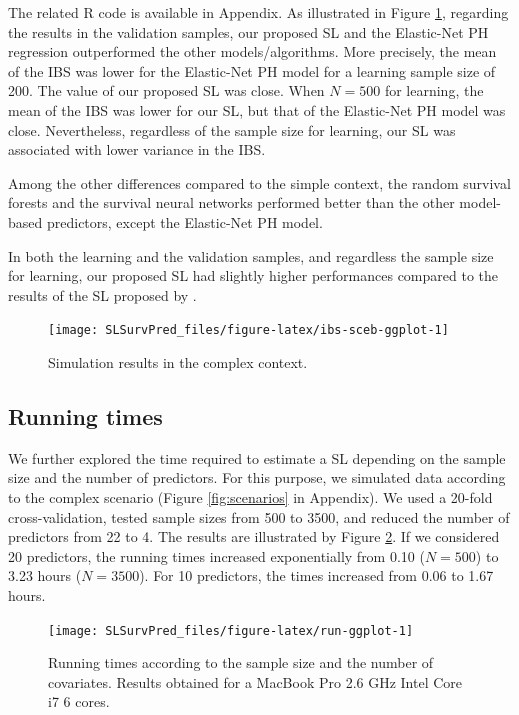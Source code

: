 The related \textsf{R} code is available in Appendix. As illustrated in Figure \ref{fig:ibs-sceb-ggplot}, regarding the results in the validation samples, our proposed SL and the Elastic-Net PH regression outperformed the other models/algorithms. More precisely, the mean of the IBS was lower for the Elastic-Net PH model for a learning sample size of 200. The value of our proposed SL was close. When \(N=500\) for learning, the mean of the IBS was lower for our SL, but that of the Elastic-Net PH model was close. Nevertheless, regardless of the sample size for learning, our SL was associated with lower variance in the IBS.

Among the other differences compared to the simple context, the random survival forests and the survival neural networks performed better than the other model-based predictors, except the Elastic-Net PH model.

In both the learning and the validation samples, and regardless the sample size for learning, our proposed SL had slightly higher performances compared to the results of the SL proposed by \citet{westlingPkgsurvSuperLearnerSuperLearning2021}.

\begin{figure}

{\centering \texttt{[image: SLSurvPred\_files/figure-latex/ibs-sceb-ggplot-1]} 

}

\caption{Simulation results in the complex context.}\label{fig:ibs-sceb-ggplot}
\end{figure}

\hypertarget{running-times}{%
\subsection{Running times}\label{running-times}}

We further explored the time required to estimate a SL depending on the sample size and the number of predictors. For this purpose, we simulated data according to the complex scenario (Figure \ref{fig:scenarios} in Appendix). We used a 20-fold cross-validation, tested sample sizes from 500 to 3500, and reduced the number of predictors from 22 to 4. The results are illustrated by Figure \ref{fig:run-ggplot}. If we considered 20 predictors, the running times increased exponentially from 0.10 (\(N=500\)) to 3.23 hours (\(N=3500\)). For 10 predictors, the times increased from 0.06 to 1.67 hours.

\begin{figure}

{\centering \texttt{[image: SLSurvPred\_files/figure-latex/run-ggplot-1]} 

}

\caption{Running times according to the sample size and the number of covariates. Results obtained for a MacBook Pro 2.6 GHz Intel Core i7 6 cores.}\label{fig:run-ggplot}
\end{figure}

